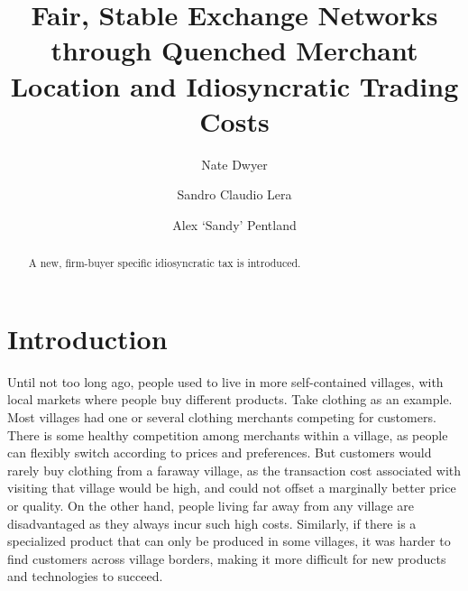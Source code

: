 \documentclass[final,3p,times,authoryear,12pt]{elsarticle}
\begin{document}
\begin{frontmatter}

\title{Fair, Stable Exchange Networks through Quenched Merchant Location and Idiosyncratic Trading Costs}

\author[add1]{Nate Dwyer}

\author[add1]{Sandro Claudio Lera}

\author[add1]{Alex `Sandy' Pentland}

\address[add1]{\scriptsize The Media Lab, Massachusetts Institute of Technology, 77 Massachusetts Avenue, 02139 Cambridge, Massachusetts, USA}

\begin{abstract} 
A new, firm-buyer specific idiosyncratic tax is introduced.
\end{abstract}

\end{frontmatter}


\section{Introduction}

Until not too long ago, people used to live in more self-contained villages,
with local markets where people buy different products.  Take clothing as an
example. Most villages had one or several clothing merchants competing for
customers.  There is some healthy competition among merchants within a village,
as people can flexibly switch according to prices and preferences. But
customers would rarely buy clothing from a faraway village, as the transaction
cost associated with visiting that village would be high,  and could not offset
a marginally better price or quality.  On the other hand, people living far
away from any village are disadvantaged as they always incur such high costs.
Similarly, if there is a specialized product that can only be produced in some
villages, it was harder to find customers across village borders,  making it
more difficult for new products and technologies to succeed. 
\end{document}
